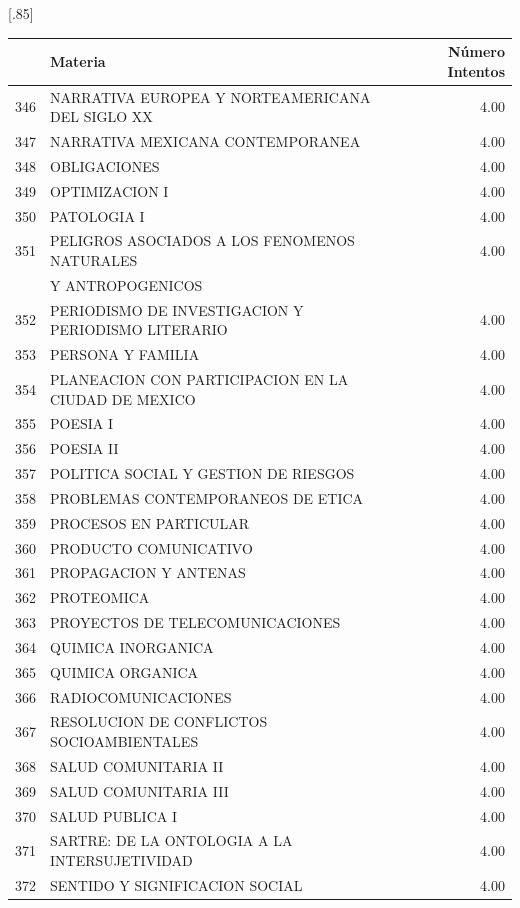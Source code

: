\documentclass[12pt]{article}
\begin{document}
\begin{table}[ht]
\centering
\scalebox{0.75}[.85]{
\begin{tabular}{rlr}
  \hline
 & Materia & N\'umero Intentos \\ 
  \hline
  346 & NARRATIVA EUROPEA Y NORTEAMERICANA DEL SIGLO XX & 4.00 \\ 
  347 & NARRATIVA MEXICANA CONTEMPORANEA & 4.00 \\ 
  348 & OBLIGACIONES & 4.00 \\ 
  349 & OPTIMIZACION I & 4.00 \\ 
  350 & PATOLOGIA I & 4.00 \\ 
  351 & PELIGROS ASOCIADOS A LOS FENOMENOS NATURALES  & 4.00 \\ 
   &  Y ANTROPOGENICOS & \\ 
  352 & PERIODISMO DE INVESTIGACION Y PERIODISMO LITERARIO & 4.00 \\ 
  353 & PERSONA Y FAMILIA & 4.00 \\ 
  354 & PLANEACION CON PARTICIPACION EN LA CIUDAD DE MEXICO & 4.00 \\ 
  355 & POESIA I & 4.00 \\ 
  356 & POESIA II & 4.00 \\ 
  357 & POLITICA SOCIAL Y GESTION DE RIESGOS & 4.00 \\ 
  358 & PROBLEMAS CONTEMPORANEOS DE ETICA & 4.00 \\ 
  359 & PROCESOS EN PARTICULAR & 4.00 \\ 
  360 & PRODUCTO COMUNICATIVO & 4.00 \\ 
  361 & PROPAGACION Y ANTENAS & 4.00 \\ 
  362 & PROTEOMICA & 4.00 \\ 
  363 & PROYECTOS DE TELECOMUNICACIONES & 4.00 \\ 
  364 & QUIMICA INORGANICA & 4.00 \\ 
  365 & QUIMICA ORGANICA & 4.00 \\ 
  366 & RADIOCOMUNICACIONES & 4.00 \\ 
  367 & RESOLUCION DE CONFLICTOS SOCIOAMBIENTALES & 4.00 \\ 
  368 & SALUD COMUNITARIA II & 4.00 \\ 
  369 & SALUD COMUNITARIA III & 4.00 \\ 
  370 & SALUD PUBLICA I & 4.00 \\ 
  371 & SARTRE: DE LA ONTOLOGIA A LA INTERSUJETIVIDAD & 4.00 \\ 
  372 & SENTIDO Y SIGNIFICACION SOCIAL & 4.00 \\ 

\end{tabular}}
\end{table}
\end{document}
